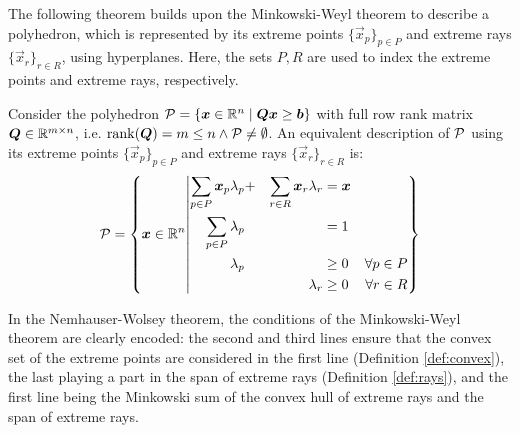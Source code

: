 The following theorem builds upon the Minkowski-Weyl theorem to describe a polyhedron, which is represented by its extreme points $\{\vec{x}_p\}_{p \in P}$ and extreme rays $\{\vec{x}_r\}_{r \in R}$, using hyperplanes. Here, the sets $P, R$ are used to index the extreme points and extreme rays, respectively.

\begin{theorem}\label{th:nemhauser-wolsey}
Consider the polyhedron $\mathcal{P} = \{{\bm{x}} \in \mathbb{R}^n \mid {\bm{Q}} {\bm{x}} \geq {\bm{b}}\}$ with full row rank matrix ${\bm{Q}} \in \mathbb{R}^{m \times n}$, i.e. $\operatorname{rank}({\bm{Q}}) = m \leq n \land \mathcal{P} \neq \emptyset$.
An equivalent description of $\mathcal{P}$ using its extreme points $\{\vec{x}_p\}_{p \in P}$ and extreme rays $\{\vec{x}_r\}_{r \in R}$ is:
\begin{equation}
\mathcal{P} = \left\{ {\bm{x}} \in \mathbb{R}^n \middle\vert
\begin{aligned}
\sum_{p \in P} {\bm{x}}_p \lambda_p &+ &\sum_{r \in R} {\bm{x}}_r \lambda_r &= {\bm{x}} &\\
\sum_{p \in P} \lambda_p & & &= 1 &\\
\lambda_p & & &\geq 0 &\forall p \in P\\
& &\lambda_r &\geq 0 &\forall r \in R
\end{aligned}
\right\}
\end{equation}
\end{theorem}

In the Nemhauser-Wolsey theorem, the conditions of the Minkowski-Weyl theorem are clearly encoded: the second and third lines ensure that the convex set of the extreme points are considered in the first line (Definition \ref{def:convex}), the last playing a part in the span of extreme rays (Definition \ref{def:rays}), and the first line being the Minkowski sum of the convex hull of extreme rays and the span of extreme rays.
